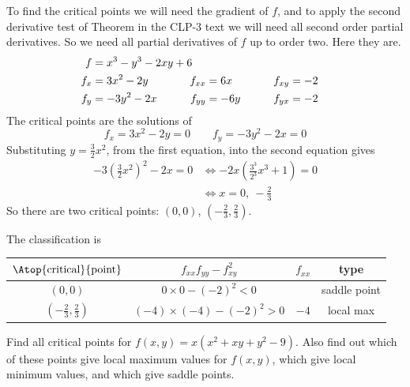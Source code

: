 \begin{solution}
To find the critical points we will need the gradient of $f$, and to 
apply the second derivative test of 
Theorem  in the CLP-3 text 
we will need all second order partial derivatives. So we need all 
partial derivatives of $f$ up to order two.
Here they are.
\begin{alignat*}{3}
f&=x^3 - y^3 - 2xy + 6 \hidewidth\\
f_x&=3x^2-2y   & f_{xx}&=6x \qquad & f_{xy}&= -2\\
f_y&=-3y^2-2x \qquad & f_{yy}&=-6y\qquad & f_{yx}&= -2
\end{alignat*}
The critical points are the solutions of
\begin{equation*}
f_x=3x^2-2y=0   \qquad
f_y=-3y^2-2x = 0
\end{equation*}
Substituting $y=\frac{3}{2}x^2$, from the first equation, into the
second equation gives
\begin{align*}
-3\left(\frac{3}{2}x^2\right)^2-2x =0
&\iff -2x\left(\frac{3^3}{2^3}x^3+1\right)=0 \\
&\iff x=0,\ -\frac{2}{3}
\end{align*}
So there are two critical points: $(0,0)$, 
        $\left(-\frac{2}{3},\frac{2}{3}\right)$.


The classification is
\begin{center}
\renewcommand{\arraystretch}{1.3}
     \begin{tabular}{|c|c|c|c|}
     \hline
    $\Atop{\text{critical}}{\text{point}}$  & $f_{xx}f_{yy}-f_{xy}^2$ & 
                                                          $f_{xx}$ & type \\    
    \hline
     $(0,0)$  & $0\times 0 -(-2)^2 < 0$ &   & saddle point  \\ \hline
     $\left(-\frac{2}{3},\frac{2}{3}\right)$  & $(-4)\times (-4)-(-2)^2>0$ & 
                      $-4$ & local max \\  \hline
     \end{tabular}
\renewcommand{\arraystretch}{1.0}
\end{center}
\end{solution}


\begin{question}[M200 2007A] %
Find all critical points for $f(x,y) = x(x^2 + xy + y^2 - 9)$.
Also find out which of these points give local maximum values for 
$f(x,y)$, which give local minimum values, and which give saddle points.
\end{question}

